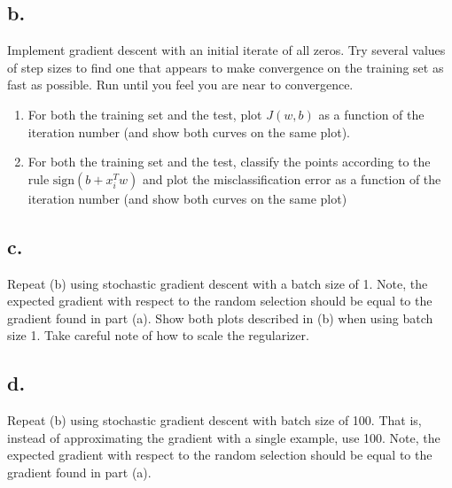 \documentclass{article}
\newcommand{\1}{\mathbf{1}}
\begin{document}
{\subsection*{b.}

Implement gradient descent with an initial iterate of all zeros. Try several values of step sizes to find one that appears to make convergence on the training set as fast as possible. Run until you feel you are near to convergence.

\begin{enumerate}
  \item For both the training set and the test, plot $J(w,b)$ as a function of the iteration number (and show both curves on the same plot).
  \item For both the training set and the test, classify the points according to the rule $\text{sign}(b + x_i^T w)$ and plot the misclassification error as a function of the iteration number (and show both curves on the same plot)
\end{enumerate}

\subsection*{c.}

Repeat (b) using stochastic gradient descent with a batch size of 1. Note, the expected gradient with respect to the random selection should be equal to the gradient found in part (a). Show both plots described in (b) when using batch size 1. Take careful note of how to scale the regularizer.

\subsection*{d.}

Repeat (b) using stochastic gradient descent with batch size of 100. That is, instead of approximating the gradient with a single example, use 100. Note, the expected gradient with respect to the random selection should be equal to the gradient found in part (a).

}
\end{document}
